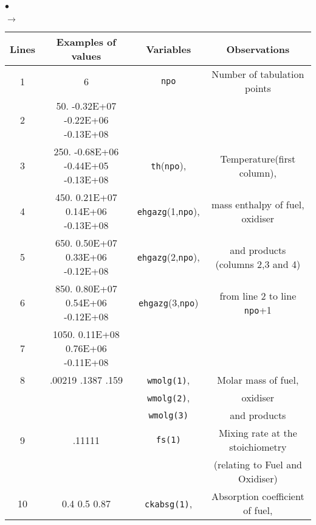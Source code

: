 {{\begin{list}{$\bullet$}{}
\begin{list}{$\rightarrow$}{}
\begin{table}[htbp]
\begin{center}
\small{
\begin{tabular}{|c|c|c|c|} \hline
 Lines  &            Examples of values     &        Variables            & Observations                                \\ \hline
   1    &                    6              &   \texttt{npo}              & Number of tabulation points                 \\ \hline
   2    &  50. -0.32E+07 -0.22E+06 -0.13E+08&                             &                                             \\
   3    & 250. -0.68E+06 -0.44E+05 -0.13E+08&\texttt{th\index{th}}(\texttt{npo}),           & Temperature(first column),                  \\
   4    & 450.  0.21E+07  0.14E+06 -0.13E+08& \texttt{ehgazg\index{ehgazg}}(1,\texttt{npo}),& mass enthalpy of fuel, oxidiser             \\
   5    & 650.  0.50E+07  0.33E+06 -0.12E+08& \texttt{ehgazg}(2,\texttt{npo}),              & and products (columns 2,3 and 4)            \\
   6    & 850.  0.80E+07  0.54E+06 -0.12E+08& \texttt{ehgazg}(3,\texttt{npo})               & from line 2 to line \texttt{npo}+1                   \\
   7    &1050.  0.11E+08  0.76E+06 -0.11E+08&                             &                                             \\ \hline
   8    & .00219       .1387        .159    &\texttt{wmolg(1)\index{wmolg}},       & Molar mass of fuel,                         \\
        &                                   &                    \texttt{wmolg(2)},& oxidiser                                    \\
        &                                   &                    \texttt{wmolg(3)} & and products                                \\ \hline
   9    &                .11111             &          \texttt{fs(1)\index{fs(1)}} & Mixing rate at the stoichiometry            \\
        &                                   &                             & (relating to Fuel and Oxidiser)             \\ \hline
  10    &    0.4      0.5       0.87        &\texttt{ckabsg\index{ckabsg}(1)},     & Absorption coefficient of fuel,             \\

\end{tabular}}
\end{center}
\end{table}
\end{list}
\end{list}}}
